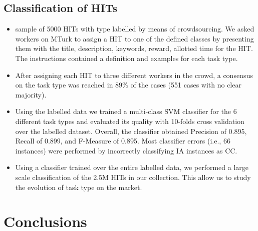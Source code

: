 \documentclass{sig-alternate}
\begin{document}
\subsection{Classification of HITs}
\begin{itemize}

	\item sample of 5000 HITs with type labelled by means of crowdsourcing. We asked workers on MTurk to assign a HIT to one of the defined classes by presenting them with the title, description, keywords, reward, allotted time for the HIT. The instructions contained a definition and examples for each task type.

	\item After assigning each HIT to three different workers in the crowd, a consensus on the task type was reached in 89\% of the cases (551 cases with no clear majority).

	\item Using the labelled data we trained a multi-class SVM classifier for the 6 different task types and evaluated its quality with 10-folds cross validation over the labelled dataset. Overall, the classifier obtained Precision of 0.895, Recall of 0.899, and F-Measure of 0.895. Most classifier errors (i.e., 66 instances) were performed by incorrectly classifying IA instances as CC.

	\item Using a classifier trained over the entire labelled data, we performed a large scale classification of the 2.5M HITs in our collection. This allow us to study the evolution of task type on the market.

\end{itemize}








\section{Conclusions}
\end{document}
